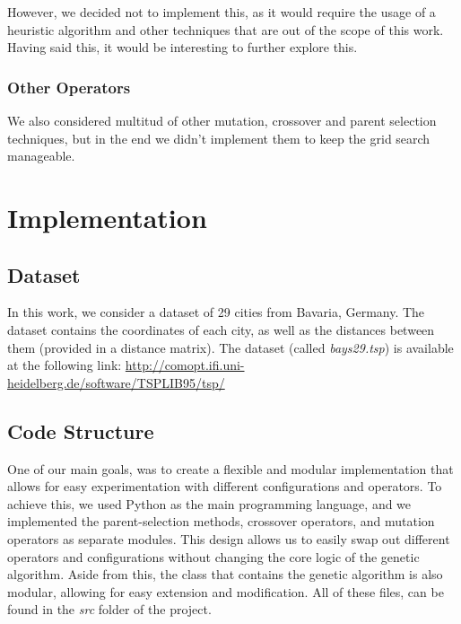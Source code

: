 \documentclass[11pt]{article}
\begin{document}
However, we decided not to implement this, as it would require the usage of a heuristic algorithm and other techniques that are out of the scope of this work. Having said this, it would be interesting to further explore this.

\subsubsection{Other Operators}
We also considered multitud of other mutation, crossover and parent selection techniques, but in the end we didn't implement them to keep the grid search manageable.

\section{Implementation}
\subsection{Dataset}
In this work, we consider a dataset of 29 cities from Bavaria, Germany. The dataset contains the coordinates of each city, as well as the distances between them (provided in a distance matrix). The dataset (called \textit{bays29.tsp}) is available at the following link: \url{http://comopt.ifi.uni-heidelberg.de/software/TSPLIB95/tsp/}

\subsection{Code Structure}
One of our main goals, was to create a flexible and modular implementation that allows for easy experimentation with different configurations and operators. To achieve this, we used Python as the main programming language, and we implemented the parent-selection methods, crossover operators, and mutation operators as separate modules. This design allows us to easily swap out different operators and configurations without changing the core logic of the genetic algorithm. Aside from this, the class that contains the genetic algorithm is also modular, allowing for easy extension and modification. All of these files, can be found in the \textit{src} folder of the project.
\end{document}
